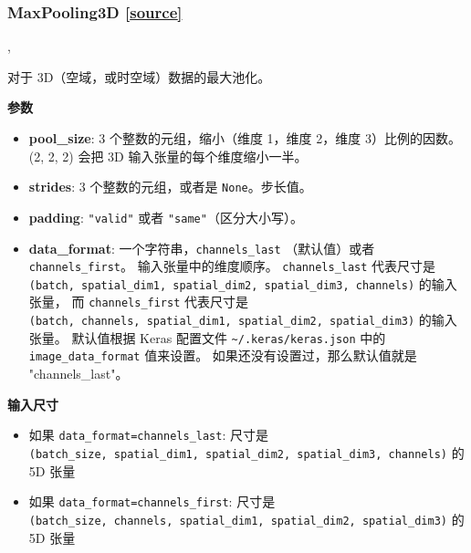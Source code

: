 \subsubsection{MaxPooling3D {\href{https://github.com/keras-team/keras/blob/master/keras/layers/pooling.py\#L339}{{[}source{]}}}}

\begin{Shaded}
\begin{Highlighting}[]
\OperatorTok{=}\NormalTok{(}\NormalTok{, }\NormalTok{, }\OperatorTok{=}\OperatorTok{=},\\
\hspace{4cm}\OperatorTok{=}\NormalTok{)}
\end{Highlighting}
\end{Shaded}

对于 3D（空域，或时空域）数据的最大池化。

\textbf{参数}

\begin{itemize}
\tightlist
\item
  \textbf{pool\_size}: 3 个整数的元组，缩小（维度 1，维度 2，维度
  3）比例的因数。 (2, 2, 2) 会把 3D 输入张量的每个维度缩小一半。
\item
  \textbf{strides}: 3 个整数的元组，或者是 \texttt{None}。步长值。
\item
  \textbf{padding}: \texttt{"valid"} 或者
  \texttt{"same"}（区分大小写）。
\item
  \textbf{data\_format}: 一个字符串，\texttt{channels\_last}
  （默认值）或者 \texttt{channels\_first}。 输入张量中的维度顺序。
  \texttt{channels\_last} 代表尺寸是
  \texttt{(batch,\ spatial\_dim1,\ spatial\_dim2,\ spatial\_dim3,\ channels)}
  的输入张量， 而 \texttt{channels\_first} 代表尺寸是
  \texttt{(batch,\ channels,\ spatial\_dim1,\ spatial\_dim2,\ spatial\_dim3)}
  的输入张量。 默认值根据 Keras 配置文件
  \texttt{\textasciitilde{}/.keras/keras.json} 中的
  \texttt{image\_data\_format} 值来设置。
  如果还没有设置过，那么默认值就是 "channels\_last"。
\end{itemize}

\textbf{输入尺寸}

\begin{itemize}
\tightlist
\item
  如果
  \texttt{data\_format=\textquotesingle{}channels\_last\textquotesingle{}}:
  尺寸是
  \texttt{(batch\_size,\ spatial\_dim1,\ spatial\_dim2,\ spatial\_dim3,\ channels)}
  的 5D 张量
\item
  如果
  \texttt{data\_format=\textquotesingle{}channels\_first\textquotesingle{}}:
  尺寸是
  \texttt{(batch\_size,\ channels,\ spatial\_dim1,\ spatial\_dim2,\ spatial\_dim3)}
  的 5D 张量
\end{itemize}

